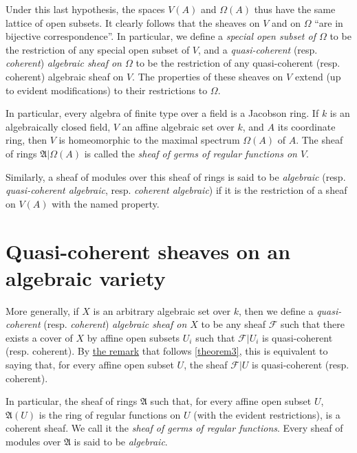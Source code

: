 \documentclass{article}
\theoremstyle{plain}
\theoremstyle{definition}
\newcommand{\sh}[1]{{\mathscr{#1}}}
\newcommand{\oldpage}[1]{\marginpar{\footnotesize$\Big\vert$ \textit{p.~#1}}}
\begin{document}
Under this last hypothesis, the spaces $V(A)$ and $\Omega(A)$ thus have the same lattice of open subsets.
It clearly follows that the sheaves on $V$ and on $\Omega$ ``are in bijective correspondence''.
In particular, we define a \emph{special open subset of $\Omega$} to be the restriction of any special open subset of $V$, and a \emph{quasi-coherent} (resp. \emph{coherent}) \emph{algebraic sheaf on $\Omega$} to be the restriction of any quasi-coherent (resp. coherent) algebraic sheaf on $V$.
The properties of these sheaves on $V$ extend (up to evident modifications) to their restrictions to $\Omega$.

In particular, every algebra of finite type over a field is a Jacobson ring.
If $k$ is an algebraically closed field, $V$ an affine algebraic set over $k$, and $A$ its coordinate ring, then $V$ is homeomorphic to the maximal spectrum
\oldpage{1-12}
$\Omega(A)$ of $A$.
The sheaf of rings $\mathfrak{A}|\Omega(A)$ is called the \emph{sheaf of germs of regular functions on $V$}.

Similarly, a sheaf of modules over this sheaf of rings is said to be \emph{algebraic} (resp. \emph{quasi-coherent algebraic}, resp. \emph{coherent algebraic}) if it is the restriction of a sheaf on $V(A)$ with the named property.


\section{Quasi-coherent sheaves on an algebraic variety}
\label{section6}

More generally, if $X$ is an arbitrary algebraic set over $k$, then we define a \emph{quasi-coherent} (resp. \emph{coherent}) \emph{algebraic sheaf on $X$} to be any sheaf $\sh{F}$ such that there exists a cover of $X$ by affine open subsets $U_i$ such that $\sh{F}|U_i$ is quasi-coherent (resp. coherent).
By \hyperref[remark-theorem3]{the remark} that follows \cref{theorem3}, this is equivalent to saying that, for every affine open subset $U$, the sheaf $\sh{F}|U$ is quasi-coherent (resp. coherent).

In particular, the sheaf of rings $\mathfrak{A}$ such that, for every affine open subset $U$, $\mathfrak{A}(U)$ is the ring of regular functions on $U$ (with the evident restrictions), is a coherent sheaf.
We call it the \emph{sheaf of germs of regular functions}.
Every sheaf of modules over $\mathfrak{A}$ is said to be \emph{algebraic}.


\end{document}
